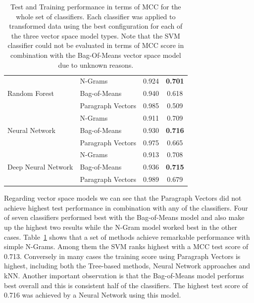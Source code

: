 \begin{table}[h]
\begin{center}
\begin{tabular}{ ll cc }
      \midrule
      \multirow{3}{*}{Random Forest}
       & N-Grams & 0.924 & \textbf{0.701} \\
       & Bag-of-Means & 0.940 & 0.618 \\
       & Paragraph Vectors & 0.985 & 0.509 \\
      \midrule
      \multirow{3}{*}{Neural Network}
       & N-Grams & 0.911 & 0.709 \\
       & Bag-of-Means & 0.930 & \textbf{0.716} \\
       & Paragraph Vectors & 0.975 & 0.665 \\
      \midrule
      \multirow{3}{*}{Deep Neural Network}
       & N-Grams & 0.913 & 0.708 \\
       & Bag-of-Means & 0.936 & \textbf{0.715} \\
       & Paragraph Vectors & 0.989 & 0.679 \\
      \bottomrule
    \end{tabular}
  \caption{Test and Training performance in terms of \gls{MCC} for the whole set of classifiers. Each classifier was applied to transformed data using the best configuration for each of the three vector space model types. Note that the SVM classifier could not be evaluated in terms of \gls{MCC} score in combination with the Bag-Of-Means vector space model due to unknown reasons.}
\label{tab:Classifier Results}
\end{center}
\end{table}

Regarding vector space models we can see that the Paragraph Vectors did not achieve highest test performance in combination with any of the classifiers. Four of seven classifiers performed best with the Bag-of-Means model and also make up the highest two results while the N-Gram model worked best in the other cases.
Table~\ref{tab:Classifier Results} shows that a set of methods achieve remarkable performance with simple N-Grams. Among them the SVM ranks highest with a \gls{MCC} test score of 0.713. Conversely in many cases the training score using Paragraph Vectors is highest, including both the Tree-based methods, Neural Network approaches and \gls{kNN}.
Another important observation is that the Bag-of-Means model performs best overall and this is consistent half of the classifiers. The highest test score of 0.716 was achieved by a Neural Network using this model.


